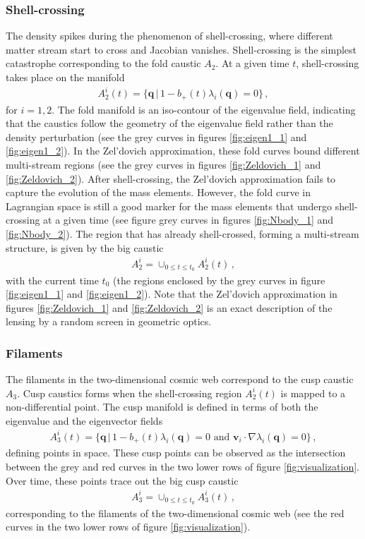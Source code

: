 \documentclass[a4paper, 11pt]{article}
\begin{document}
\subsubsection{Shell-crossing}
The density spikes during the phenomenon of shell-crossing, where different matter stream start to cross and Jacobian vanishes. Shell-crossing is the simplest catastrophe corresponding to the fold caustic $A_2$. At a given time $t$, shell-crossing takes place on the manifold
\begin{align}
A_2^i(t) = \{\bm{q}\,|\, 1- b_+(t)\lambda_i(\bm{q})=0\}\,,
\end{align}
for $i=1,2$. The fold manifold is an iso-contour of the eigenvalue field, indicating that the caustics follow the geometry of the eigenvalue field rather than the density perturbation (see the grey curves in figures \ref{fig:eigen1_1} and \ref{fig:eigen1_2}). In the Zel'dovich approximation, these fold curves bound different multi-stream regions (see the grey curves in figures \ref{fig:Zeldovich_1} and \ref{fig:Zeldovich_2}). After shell-crossing, the Zel'dovich approximation fails to capture the evolution of the mass elements. However, the fold curve in Lagrangian space is still a good marker for the mass elements that undergo shell-crossing at a given time (see figure grey curves in figures \ref{fig:Nbody_1} and \ref{fig:Nbody_2}). The region that has already shell-crossed, forming a multi-stream structure, is given by the big caustic
\begin{align}
A_2^i = \cup_{0 \leq t \leq t_0} A_2^i(t)\,,
\end{align}
with the current time $t_0$ (the regions enclosed by the grey curves in figure \ref{fig:eigen1_1} and \ref{fig:eigen1_2}). Note that the Zel'dovich approximation in figures \ref{fig:Zeldovich_1} and \ref{fig:Zeldovich_2} is an exact description of the lensing by a random screen in geometric optics.

\subsubsection{Filaments}
The filaments in the two-dimensional cosmic web correspond to the cusp caustic $A_3$. Cusp caustics forms when the shell-crossing region $A_2^i(t)$ is mapped to a non-differential point. The cusp manifold is defined in terms of both the eigenvalue and the eigenvector fields
\begin{align}
A_3^i(t)=\{\bm{q}\,|\,1- b_+(t)\lambda_i(\bm{q})=0 \text{ and } \bm{v}_i \cdot \nabla \lambda_i(\bm{q}) = 0\}\,,
\end{align}
defining points in space. These cusp points can be observed as the intersection between the grey and red curves in the two lower rows of figure \ref{fig:visualization}. Over time, these points trace out the big cusp caustic
\begin{align}
A_3^i = \cup_{0 \leq t \leq t_0} A_3^i(t)\,,
\end{align}
corresponding to the filaments of the two-dimensional cosmic web (see the red curves in the two lower rows of figure \ref{fig:visualization}).
\end{document}
